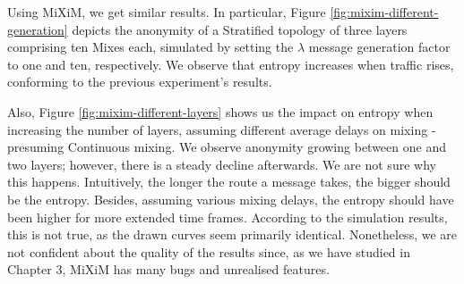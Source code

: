 \documentclass[logo,msc,cyber]{infthesis}   %
\begin{document}
 Using MiXiM, we get similar results. In particular, Figure
 \ref{fig:mixim-different-generation} depicts the anonymity of a Stratified
 topology of three layers comprising ten Mixes each, simulated by setting the
 $\lambda$ message generation factor to one and ten, respectively. We observe that
 entropy increases when traffic rises, conforming to the previous experiment's
 results.

 Also, Figure \ref{fig:mixim-different-layers} shows us the impact on entropy
 when increasing the number of layers, assuming different average delays on
 mixing - presuming Continuous mixing. We observe anonymity growing between one
 and two layers; however, there is a steady decline afterwards. We are not sure
 why this happens. Intuitively, the longer the route a message takes, the bigger
 should be the entropy. Besides, assuming various mixing delays, the entropy
 should have been higher for more extended time frames. According to the
 simulation results, this is not true, as the drawn curves seem primarily
 identical. Nonetheless, we are not confident about the quality of the results
 since, as we have studied in Chapter 3, MiXiM has many bugs and unrealised
 features.
\end{document}
